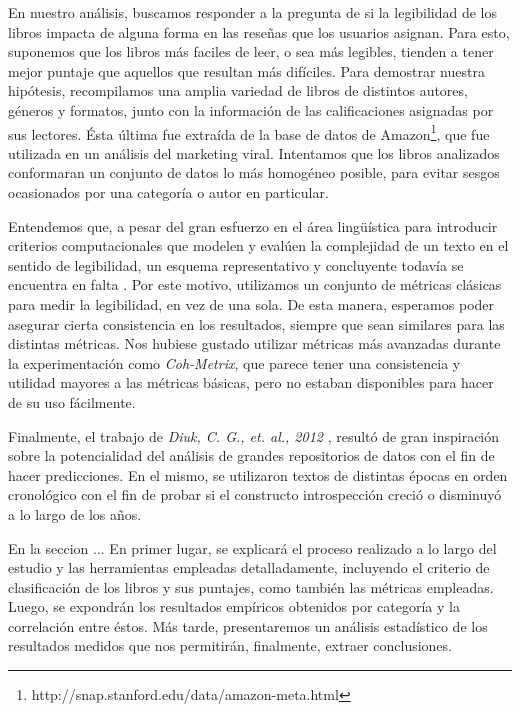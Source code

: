 \documentclass[12pt,journal,compsoc]{IEEEtran}
\begin{document}
En nuestro análisis, buscamos responder a la pregunta de si la legibilidad de los libros impacta de alguna forma en las reseñas que los usuarios asignan. Para esto, suponemos que los libros más faciles de leer, o sea más legibles, tienden a tener mejor puntaje que aquellos que resultan más difíciles. Para demostrar nuestra hipótesis, recompilamos una amplia variedad de libros de distintos autores, géneros y formatos, junto con la información de las calificaciones asignadas por sus lectores. Ésta última fue extraída de la base de datos de Amazon\footnote{http://snap.stanford.edu/data/amazon-meta.html}, que fue utilizada en un análisis del marketing viral\cite{leskovec}. Intentamos que los libros analizados conformaran un conjunto de datos lo más homogéneo posible, para evitar sesgos ocasionados por una categoría o autor en particular.

Entendemos que, a pesar del gran esfuerzo en el área lingüística para introducir criterios computacionales que modelen y evalúen la complejidad de un texto en el sentido de legibilidad, un esquema representativo y concluyente todavía se encuentra en falta \cite{orlow, klare, kanungo, karmakar}. Por este motivo, utilizamos un conjunto de métricas clásicas para medir la legibilidad, en vez de una sola. De esta manera, esperamos poder asegurar cierta consistencia en los resultados, siempre que sean similares para las distintas métricas\cite{izgi}. Nos hubiese gustado utilizar métricas más avanzadas durante la experimentación como \textit{Coh-Metrix}\cite{graesser}, que parece tener una consistencia y utilidad mayores a las métricas básicas\cite{crossley}, pero no estaban disponibles para hacer de su uso fácilmente.

Finalmente, el trabajo de \textit{Diuk, C. G., et. al., 2012} \cite{diuk}, resultó de gran inspiración sobre la potencialidad del análisis de grandes repositorios de datos con el fin de hacer predicciones. En el mismo, se utilizaron textos de distintas épocas en orden cronológico con el fin de probar si el constructo introspección creció o disminuyó a lo largo de los años.

En la seccion ... %
En primer lugar, se explicará el proceso realizado a lo largo del estudio y las herramientas empleadas detalladamente, incluyendo el criterio de clasificación de los libros y sus puntajes, como también las métricas empleadas. Luego, se expondrán los resultados empíricos obtenidos por categoría y la correlación entre éstos. Más tarde, presentaremos un análisis estadístico de los resultados medidos que nos permitirán, finalmente, extraer conclusiones.
\end{document}
